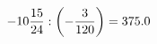 \documentclass[preview]{standalone}
\begin{document}
\begin{align*}
-10 { 15 \over 24 }  :  \left( - { 3 \over 120 } \right) = 375.0
\end{align*}
\end{document}
